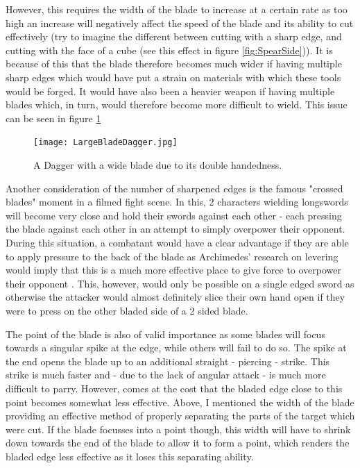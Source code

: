 \documentclass{article}
\begin{document}
However, this requires the width of the blade to increase at a certain rate as too high an increase will negatively affect the speed of the blade and its ability to cut effectively (try to imagine the different between cutting with a sharp edge, and cutting with the face of a cube (see this effect in figure \ref{fig:SpearSide})). It is because of this that the blade therefore becomes much wider if having multiple sharp edges which would have put a strain on materials with which these tools would be forged. It would have also been a heavier weapon if having multiple blades which, in turn, would therefore become more difficult to wield. This issue can be seen in figure \ref{fig:WideDagger}

\begin{figure}[h]
    \centering
    \texttt{[image: LargeBladeDagger.jpg]}
    \caption{A Dagger with a wide blade due to its double handedness.}
    \label{fig:WideDagger}
\end{figure}

Another consideration of the number of sharpened edges is the famous "crossed blades" moment in a filmed fight scene. In this, 2 characters wielding longswords will become very close and hold their swords against each other - each pressing the blade against each other in an attempt to simply overpower their opponent. During this situation, a combatant would have a clear advantage if they are able to apply pressure to the back of the blade as Archimedes' research on levering would imply that this is a much more effective place to give force to overpower their opponent \parencite{bunn2017archimedes}. This, however, would only be possible on a single edged sword as otherwise the attacker would almost definitely slice their own hand open if they were to press on the other bladed side of a 2 sided blade.

The point of the blade is also of valid importance as some blades will focus towards a singular spike at the edge, while others will fail to do so. The spike at the end opens the blade up to an additional straight - piercing - strike. This strike is much faster and - due to the lack of angular attack - is much more difficult to parry. However, comes at the cost that the bladed edge close to this point becomes somewhat less effective. Above, I mentioned the width of the blade providing an effective method of properly separating the parts of the target which were cut. If the blade focusses into a point though, this width will have to shrink down towards the end of the blade to allow it to form a point, which renders the bladed edge less effective as it loses this separating ability.
\end{document}
